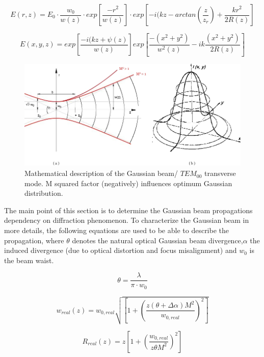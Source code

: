 \begin{equation}
	E(r,z) = E_{0}\cdot \frac{w_{0}}{w(z)} \cdot exp\left[\frac{-r^{2}}{w(z)}\right]\cdot exp\left[-i(kz-arctan\left(\frac{z}{z_{r}}\right)+\frac{kr^{2}}{2R(z)}\right]
\end{equation}

\begin{equation}
	E(x,y,z) = exp\left[\frac{-i(kz + \psi(z)}{w(z)}\right]exp\left[\frac{-(x^{2}+y^{2})}{w^{2}(z)} - ik \frac{(x^{2}+y^{2})}{2R(z)}\right]
\end{equation}

\begin{figure} [ht]
\centering
\includegraphics[scale=0.5]{chapters/img/TEM00.jpg}	
\caption{Mathematical description of the Gaussian beam/ $TEM_{00}$ transverse mode. M squared factor (negatively) influences optimum Gaussian distribution.}
\label{gaussian_beam}
\end{figure}

The main point of this section is to determine the Gaussian beam propagations dependency on diffraction phenomenon. To characterize the Gaussian beam in more details, the following equations are used to be able to describe the propagation, where $\theta$ denotes the natural optical Gaussian beam divergence,$\alpha$ the induced divergence (due to optical distortion and focus misalignment) and $w_{0}$ is the beam waist. 

\begin{equation}
\theta = \frac{\lambda}{\pi\cdot w_{0}}
\end{equation}

\begin{equation}
w_{real}(z)=w_{0,real}\sqrt{\left[1 + \left(\frac{z(\theta+\Delta \alpha) M^{2}}{w_{0,real}}\right)^{2}\right]}
\end{equation}

\begin{equation}
R_{real}(z)=z\left[1 + \left(\frac{w_{0,real}}{z\theta M^{2}}\right)^{2}\right]
\end{equation}

